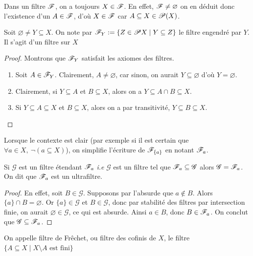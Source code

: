 \begin{remarque}
    Dans un filtre $\mathscr{F}$, on a toujours $X\in \mathscr{F}$. En effet, $\mathscr{F}\neq\varnothing$ on en déduit donc  l'existence d'un $A\in \mathscr{F}$, d'où $X\in\mathscr{F}$ car $A\subseteq X\in\mathscr{P}(X)$.
\end{remarque}
\begin{notation}
    Soit $\varnothing\ne Y\subseteq X$. On note par $\mathscr{F}_Y := \{ Z\in\mathscr{P} X\mid Y\subseteq Z\}$ le filtre engendré par $Y$. Il s'agit d'un filtre sur $X$
\end{notation}
\begin{proof} Montrons que $\mathscr{F}_Y$ satisfait les axiomes des filtres.
    \begin{enumerate} 
        \item Soit $A\in\mathscr{F}_Y$. Clairement, $A\ne \varnothing$, car sinon, on aurait $Y\subseteq \varnothing$ d'où $Y = \varnothing$.
        \item Clairement, si $Y\subseteq A$ et $B\subseteq X$, alors on a $Y\subseteq A \cap B\subseteq X$.
        \item Si $Y\subseteq A\subseteq X$ et $B\subseteq X$, alors on a par transitivité, $Y\subseteq B\subseteq X$.
    \end{enumerate}
\end{proof}
\begin{notation}
    Lorsque le contexte est clair (par exemple si il est certain que $\forall a\in X,\ \neg(a\subseteq X)$), on simplifie l'écriture de $\mathscr{F}_{\{a\}}$ en notant $\mathscr{F}_a$. 
\end{notation}
\begin{proposition}
Si $\mathscr{G}$ est un filtre étendant $\mathscr{F}_a$ \textit{i.e} $\mathscr G$ est un filtre tel que $\mathscr{F}_a \subseteq\mathscr{G}$ alors $\mathscr{G}=\mathscr{F}_a$.  On dit que $\mathscr{F}_a$ est un ultrafiltre.
\end{proposition}
\begin{proof}
En effet, soit $B\in \mathscr{G}$. Supposons par l'absurde que $a\notin B$. 
Alors $\{a\}\cap B = \varnothing$. 
Or $\{a\}\in\mathscr{G}$ et $B\in\mathscr{G}$, donc par stabilité des filtres par intersection finie, 
on aurait $\varnothing \in \mathscr{G}$, ce qui est absurde. 
Ainsi $a\in B$, donc $B\in \mathscr{F}_a$. 
On conclut que $\mathscr{G}\subseteq \mathscr{F}_a$.
\end{proof}

\begin{exemple}On appelle filtre de Frêchet, ou filtre des cofinis de $X$, le filtre $\{A\subseteq X \mid X\setminus A \text{ est fini}\}$
\end{exemple}

